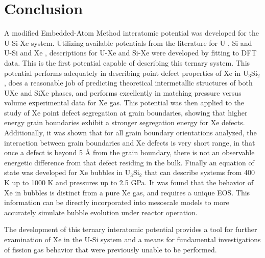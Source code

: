 \documentclass[review]{elsarticle}
\begin{document}
\section{Conclusion}

A modified Embedded-Atom Method interatomic potential was developed for the U-Si-Xe system. Utilizing available potentials from the literature for U \cite{moore2015}, Si and U-Si \cite{beelerusi} and Xe \cite{beelerASTM}, descriptions for U-Xe and Si-Xe were developed by fitting to DFT data. This is the first potential capable of describing this ternary system. This potential performs adequately in describing point defect properties of Xe in U$_3$Si$_2$, does a reasonable job of predicting theoretical intermetallic structures of both UXe and SiXe phases, and performs excellently in matching pressure versus volume experimental data for Xe gas. This potential was then applied to the study of Xe point defect segregation at grain boundaries, showing that higher energy grain boundaries exhibit a stronger segregation energy for Xe defects. Additionally, it was shown that for all grain boundary orientations analyzed, the interaction between grain boundaries and Xe defects is very short range, in that once a defect is beyond 5 {\AA} from the grain boundary, there is not an observable energetic difference from that defect residing in the bulk. Finally an equation of state was developed for Xe bubbles in U$_3$Si$_2$ that can describe systems from 400 K up to 1000 K and pressures up to 2.5 GPa. It was found that the behavior of Xe in bubbles is distinct from a pure Xe gas, and requires a unique EOS. This information can be directly incorporated into mesoscale models to more accurately simulate bubble evolution under reactor operation. 

The development of this ternary interatomic potential provides a tool for further examination of Xe in the U-Si system and a means for fundamental investigations of fission gas behavior that were previously unable to be performed. 
\end{document}
